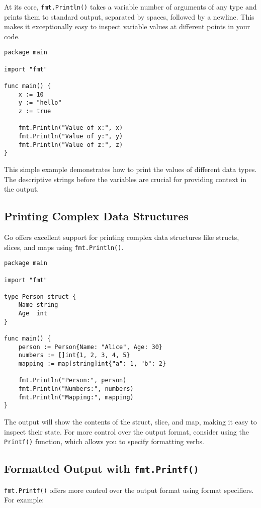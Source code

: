 \documentclass{article}
\begin{document}
{{{{At its core, \texttt{fmt.Println()} takes a variable number of arguments of any type and prints them to standard output, separated by spaces, followed by a newline. This makes it exceptionally easy to inspect variable values at different points in your code.

\begin{verbatim}
package main

import "fmt"

func main() {
    x := 10
    y := "hello"
    z := true

    fmt.Println("Value of x:", x)
    fmt.Println("Value of y:", y)
    fmt.Println("Value of z:", z)
}
\end{verbatim}

This simple example demonstrates how to print the values of different data types.  The descriptive strings before the variables are crucial for providing context in the output.

\subsection*{Printing Complex Data Structures}

Go offers excellent support for printing complex data structures like structs, slices, and maps using \texttt{fmt.Println()}.

\begin{verbatim}
package main

import "fmt"

type Person struct {
    Name string
    Age  int
}

func main() {
    person := Person{Name: "Alice", Age: 30}
    numbers := []int{1, 2, 3, 4, 5}
    mapping := map[string]int{"a": 1, "b": 2}

    fmt.Println("Person:", person)
    fmt.Println("Numbers:", numbers)
    fmt.Println("Mapping:", mapping)
}
\end{verbatim}

The output will show the contents of the struct, slice, and map, making it easy to inspect their state.  For more control over the output format, consider using the \texttt{Printf()} function, which allows you to specify formatting verbs.

\subsection*{Formatted Output with \texttt{fmt.Printf()}}

\texttt{fmt.Printf()} offers more control over the output format using format specifiers. For example:

}}}}
\end{document}
